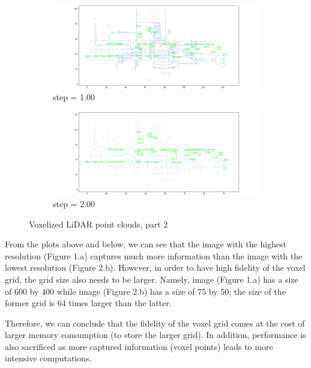 \documentclass[letter]{article}
\begin{document}
	\begin{figure}[h]
		\begin{subfigure}[t]{\textwidth}
			\centering
			\includegraphics[width=\linewidth]{images/vox000_step1-00.png}
			\caption{step = 1.00}
		\end{subfigure}
		\vspace*{1mm}
	  
		\begin{subfigure}[t]{\textwidth}
			\centering
			\includegraphics[width=\linewidth]{images/vox000_step2-00.png}
			\caption{step = 2.00}
		\end{subfigure}

		\caption{Voxelized LiDAR point clouds, part 2}
	\end{figure}

	From the plots above and below, we can see that the image with the highest resolution (Figure 1.a) captures much more information than the image with the lowest resolution (Figure 2.b). However, in order to have high fidelity of the voxel grid, the grid size also needs to be larger. Namely, image (Figure 1.a) has a size of 600 by 400 while image (Figure 2.b) has a size of 75 by 50; the size of the former grid is 64 times larger than the latter. 

	Therefore, we can conclude that the fidelity of the voxel grid comes at the cost of larger memory consumption (to store the larger grid). In addition, performance is also sacrificed as more captured information (voxel points) leads to more intensive computations. 
\end{document}
